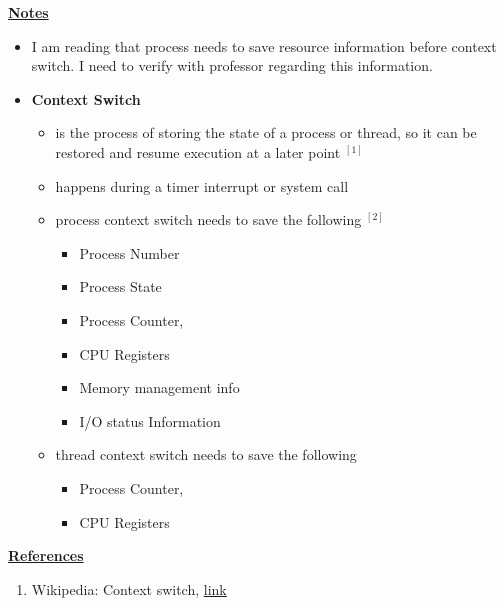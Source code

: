 \documentclass[12pt]{article}
\begin{document}
\begin{enumerate}[1.]
\begin{enumerate}[a)]
        \underline{\textbf{Notes}}

        \begin{itemize}
            \item I am reading that process needs to save resource information
            before context switch. I need to verify with professor regarding this information.
            \item \textbf{Context Switch}

            \begin{itemize}
                \item is the process of storing the state of a process or thread,
                so it can be restored and resume execution at a later point $^{[1]}$
                \item happens during a timer interrupt or system call
                \item process context switch needs to save the following $^{[2]}$

                \begin{itemize}
                    \item Process Number
                    \item Process State
                    \item Process Counter,
                    \item CPU Registers
                    \item Memory management info
                    \item I/O status Information
                \end{itemize}

                \item thread context switch needs to save the following

                \begin{itemize}
                    \item Process Counter,
                    \item CPU Registers
                \end{itemize}
            \end{itemize}
        \end{itemize}

        \bigskip

        \underline{\textbf{References}}

        \begin{enumerate}[1)]
            \item Wikipedia: Context switch, \href{https://en.wikipedia.org/wiki/Context_switch}{link}
        \end{enumerate}
    \end{enumerate}

    \bigskip
\end{enumerate}
\end{document}
